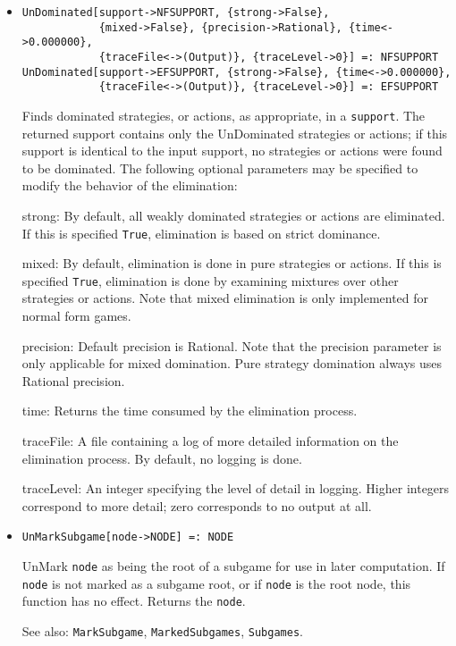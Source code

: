 \begin{itemize}
\item{}
\protect \large \begin{verbatim}
UnDominated[support->NFSUPPORT, {strong->False}, 
            {mixed->False}, {precision->Rational}, {time<->0.000000}, 
            {traceFile<->(Output)}, {traceLevel->0}] =: NFSUPPORT 
UnDominated[support->EFSUPPORT, {strong->False}, {time<->0.000000}, 
            {traceFile<->(Output)}, {traceLevel->0}] =: EFSUPPORT 
\end{verbatim}\normalsize

\bd
Finds dominated strategies, or actions, as appropriate, in a 
\verb+support+.  The returned support contains only the UnDominated
strategies or actions; if this support is identical to the input support,
no strategies or actions were found to be dominated.  The following
optional parameters may be specified to modify the behavior of
the elimination:

\bd
\item [strong:] By default, all weakly dominated strategies or actions
are eliminated.  If this is specified \verb+True+, elimination is based
on strict dominance.
\item [mixed:] By default, elimination is done in pure strategies or
actions.  If this is specified \verb+True+, elimination is done by
examining mixtures over other strategies or actions.  Note that mixed 
elimination is only implemented for normal form games.  
\item [precision:] Default precision is Rational.  Note that the precision
parameter is only applicable for mixed domination.  Pure strategy
domination always uses Rational precision.
\item [time:] Returns the time consumed by the elimination process.
\item [traceFile:] A file containing a log of more detailed information
on the elimination process.  By default, no logging is done.
\item [traceLevel:] An integer specifying the level of detail in logging.
Higher integers correspond to more detail; zero corresponds to no output
at all.
\ed
\ed

\item{}
\protect \large \begin{verbatim}
UnMarkSubgame[node->NODE] =: NODE 
\end{verbatim}\normalsize

\bd
UnMark \verb+node+ as being the root of a subgame for use in later
computation.  If \verb+node+ is not marked as a subgame root, or if
\verb+node+ is the root node, this function has no effect.  Returns
the \verb+node+.
\item [See also:] \verb+MarkSubgame+, \verb+MarkedSubgames+,
\verb+Subgames+.
\ed



\end{itemize}
